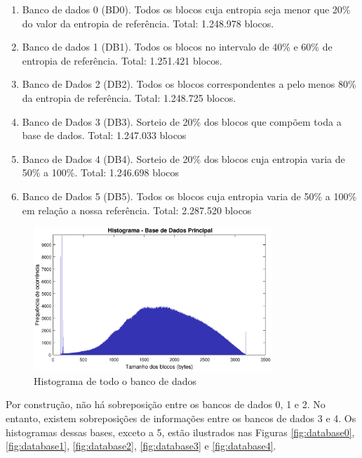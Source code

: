 \begin {enumerate}
\label{list:bds}
\item Banco de dados 0 (BD0). Todos os blocos cuja entropia seja menor que 20\% do valor da entropia de referência. Total: 1.248.978 blocos. 
\item Banco de dados 1 (DB1). Todos os blocos no intervalo de 40\% e 60\% de entropia de referência. Total: 1.251.421 blocos.
\item Banco de Dados 2 (DB2). Todos os blocos correspondentes a pelo menos 80\% da entropia de referência. Total: 1.248.725 blocos.
\item Banco de Dados 3 (DB3). Sorteio de 20\% dos blocos que compõem toda a base de dados. Total: 1.247.033 blocos
\item Banco de Dados 4 (DB4). Sorteio de 20\% dos blocos cuja entropia varia de 50\% a 100\%. Total: 1.246.698 blocos
\item Banco de Dados 5 (DB5). Todos os blocos cuja entropia varia de 50\% a 100\% em relação a nossa referência. Total: 2.287.520 blocos
\end{enumerate}


\begin{figure}[htbp]
\centering
\includegraphics[width=0.80\textwidth]{figuras/hist.eps}
\caption[Histograma de todo o banco de dados]{Histograma de todo o banco de dados}
\label{fig:histdatabase}
\end{figure}


Por construção, não há sobreposição entre os bancos de dados 0, 1 e 2. No entanto, existem sobreposições de informações entre os bancos de dados 3 e 4. Os histogramas dessas bases, exceto a 5, estão ilustrados nas Figuras \ref{fig:database0}, \ref{fig:database1}, \ref{fig:database2}, \ref{fig:database3} e \ref{fig:database4}.


